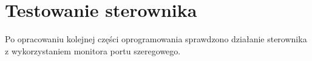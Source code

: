 \documentclass[11pt]{report}
\begin{document}
 \section{Testowanie sterownika}
 Po opracowaniu kolejnej części oprogramowania sprawdzono działanie sterownika z wykorzystaniem monitora portu szeregowego.

 
 
 
 
\end{document}
